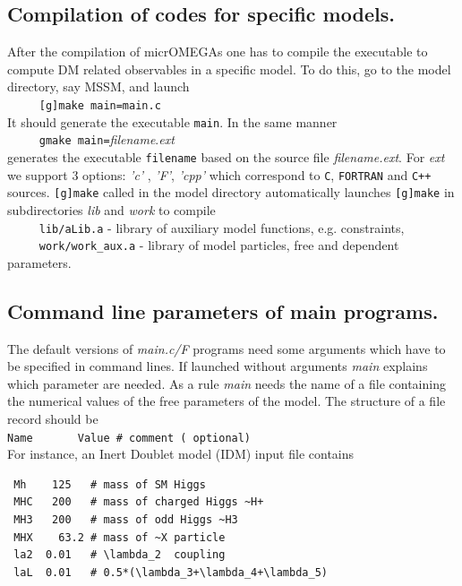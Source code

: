 \documentclass[12pt,a4paper]{article}
\begin{document}
\subsection{Compilation of codes for specific models.}
 After the compilation of micrOMEGAs one has to compile
the executable to compute DM related observables in a specific model. To
do this, go to the model directory, say MSSM,  and launch\\
\verb|     [g]make main=main.c|\\
It should generate the executable {\tt main}. In the same manner\\
\verb|     gmake main=|{\it filename}.{\it ext}\\ 
generates the executable {\tt filename}  based on the source file {\it
filename.ext}.
For {\it ext}  we support 3 options: {\it 'c'} , {\it 'F'}, {\it 'cpp'} which correspond to
{\tt C}, {\tt FORTRAN} and {\tt C++} sources.
{\tt [g]make} called  in the model directory automatically  launches {\tt [g]make}
in subdirectories {\it lib} and {\it work} to compile \\
 \verb|     lib/aLib.a|   - library of auxiliary model functions, e.g. constraints,\\
 \verb|     work/work_aux.a| - library of model particles, free and dependent parameters.\\

\subsection{ Command line parameters of main programs.}
\label{sec:command}
The default versions of {\it main.c/F}  programs need some arguments
which have to be specified in command lines. If launched without
arguments {\it main} explains which parameter are needed. 
As a rule  {\it main}  needs  the name of a file containing the
numerical values of the free parameters of the model. The structure of a file
record should be\\
\verb|Name       Value # comment ( optional)|\\
For instance, an Inert Doublet model (IDM) input file contains
\begin{verbatim}
 Mh    125   # mass of SM Higgs 
 MHC   200   # mass of charged Higgs ~H+
 MH3   200   # mass of odd Higgs ~H3
 MHX    63.2 # mass of ~X particle
 la2  0.01   # \lambda_2  coupling
 laL  0.01   # 0.5*(\lambda_3+\lambda_4+\lambda_5)
\end{verbatim}
\end{document}
